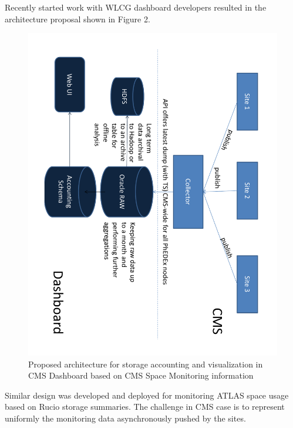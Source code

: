 Recently started work with WLCG dashboard developers resulted in the architecture 
proposal shown in Figure 2.
\begin{figure}[h]
\center
\includegraphics[width=0.8\linewidth, angle =90]
 {pictures/SpaceMonVisProposal-p1.pdf}    
\caption{Proposed architecture for storage accounting and visualization 
in CMS Dashboard based on CMS Space Monitoring information}
\label{fig:vis_proposal}
\end{figure}

Similar design was developed and deployed for monitoring ATLAS space usage 
based on Rucio \cite{Rucio} storage summaries. The challenge in CMS case is to 
represent uniformly the monitoring data asynchronously pushed by the sites.
